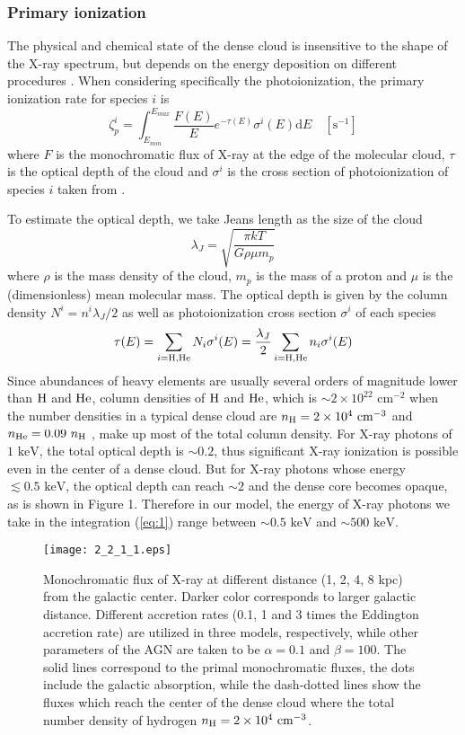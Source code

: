 \documentclass[twocolumn]{aastex62}
\begin{document}
	\subsubsection{Primary ionization}
The physical and chemical state of the dense cloud is insensitive to the shape of the X-ray spectrum, but depends on the energy deposition on different procedures \citep{Maloney1996}. When considering specifically the photoionization, the primary ionization rate for species $i$ is \citep{Latif2015}
\begin{equation}
\label{eq:1}
\zeta_p^i=\int_{E_{min}}^{E_{max}}\frac{F(E)}{E}e^{-\tau(E)}\sigma^i(E)\text{d}E \quad \left[ \mathrm { s } ^ { - 1 } \right]
\end{equation}
where $F$ is the monochromatic flux of X-ray at the edge of the molecular cloud, $\tau$ is the optical depth of the cloud and $\sigma^i$ is the cross section of photoionization of species $i$ taken from \cite{Verner1996}. 

To estimate the optical depth, we take Jeans length as the size of the cloud
$$
\lambda_J=\sqrt{\frac{\pi kT}{G\rho \mu m_p}}
$$
where $\rho$ is the mass density of the cloud, $m_p$ is the mass of a proton and $\mu$ is the (dimensionless) mean molecular mass. The optical depth is given by the column density $N^i=n^i\lambda_J/2$ as well as photoionization cross section $\sigma^i$ of each species
$$
\tau(E)=\sum_{i=\ce H,\ce{He}}N_i\sigma^i(E)=\frac{\lambda_J}{2}\sum_{i=\ce H,\ce {He}}n_i\sigma^i(E)
$$
Since abundances of heavy elements are usually several orders of magnitude lower than $\ce{H}$ and $\ce{He}$, column densities of $\ce{H}$ and $\ce{He}$, which is $\sim2\times10^{22}\text{ cm}^{-2}$ when the number densities in a typical dense cloud are $n_{\ce{H}}=2\times10^4\text{ cm}^{-3}$ and $n_{\ce{He}}=0.09\ n_{\ce{H}}$ \citep{Ruffle2003,Wakelam2008}, make up most of the total column density. For X-ray photons of $1\text{ keV}$, the total optical depth is $\sim0.2$, thus significant X-ray ionization is possible even in the center of a dense cloud.  But for X-ray photons whose energy $\lesssim 0.5\text{ keV}$, the optical depth can reach $\sim2$ and the dense core becomes opaque, as is shown in Figure 1. Therefore in our model, the energy of X-ray photons we take in the integration (\ref{eq:1}) range between $\sim0.5\text{ keV}$ and $\sim 500\text{ keV}$. 
\begin{figure}
	\centering
	\texttt{[image: 2\_2\_1\_1.eps]}
	\caption{Monochromatic flux of X-ray at different distance (1, 2, 4, 8 kpc) from the galactic center. Darker color corresponds to larger galactic distance. Different accretion rates (0.1, 1 and 3 times the Eddington accretion rate) are utilized in three models, respectively, while other parameters of the AGN are taken to be $\alpha=0.1$ and $\beta=100$. The solid lines correspond to the primal monochromatic fluxes, the dots include the galactic absorption, while the dash-dotted lines show the fluxes which reach the center of the dense cloud where the total number density of hydrogen $n_{\ce{H}}=2\times10^4\text{ cm}^{-3}$.}
\end{figure}
\end{document}
